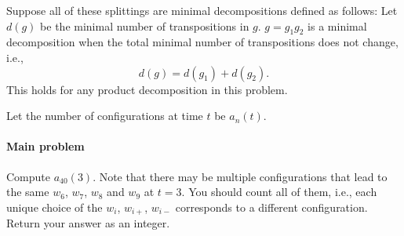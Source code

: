 Suppose all of these splittings are minimal decompositions defined as follows: Let $d(g)$ be the minimal number of transpositions in $g$. $g = g_1 g_2$ is a minimal decomposition when the total minimal number of transpositions does not change, i.e.,
\begin{equation}
d(g) = d(g_1) + d(g_2).
\end{equation}
This holds for any product decomposition in this problem.

Let the number of configurations at time $t$ be $a_n(t)$.

\paragraph*{Main problem}

Compute $a_{40}(3)$. Note that there may be multiple configurations that lead to the same {\color{blue}$w_6$, $w_7$, $w_8$ and $w_9$} at $t = 3$. You should count all of them{\color{blue}, i.e., each unique choice of the $w_i$, $w_{i+}$, $w_{i-}$ corresponds to a different configuration}. Return your answer as an integer.
